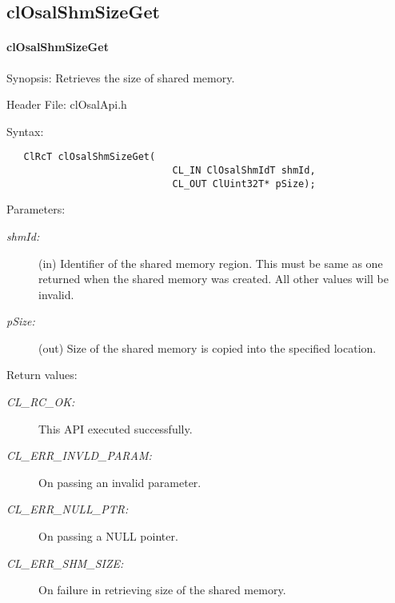 \subsection{clOsalShmSizeGet}
\hypertarget{pageosal152}{}\paragraph{cl\-Osal\-Shm\-Size\-Get}\label{pageosal152}
\begin{Desc}
\item[Synopsis:]Retrieves the size of shared memory.\end{Desc}
\begin{Desc}
\item[Header File:]clOsalApi.h\end{Desc}
\begin{Desc}
\item[Syntax:]

\footnotesize\begin{verbatim}   ClRcT clOsalShmSizeGet(
                             CL_IN ClOsalShmIdT shmId,
                             CL_OUT ClUint32T* pSize);
\end{verbatim}
\normalsize
\end{Desc}
\begin{Desc}
\item[Parameters:]
\begin{description}
\item[{\em shm\-Id:}](in) Identifier of the shared memory region. This must be same as one returned when the shared memory was created. All other values 
will be invalid.\item[{\em p\-Size:}](out) Size of the shared memory is copied into the specified location.\end{description}
\end{Desc}
\begin{Desc}
\item[Return values:]
\begin{description}
\item[{\em CL\_\-RC\_\-OK:}]This API executed successfully. \item[{\em CL\_\-ERR\_\-INVLD\_\-PARAM:}]On passing an invalid parameter. \item[{\em CL\_\-ERR\_\-NULL\_\-PTR:}]On passing a NULL pointer. \item[{\em CL\_\-ERR\_\-SHM\_\-SIZE:}]On failure in retrieving size of the shared memory.\end{description}
\end{Desc}
